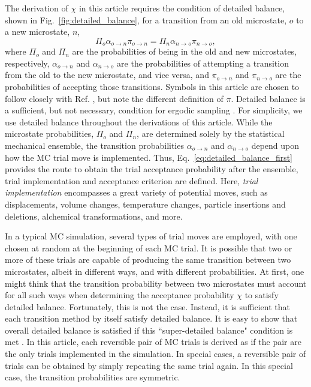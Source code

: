 \documentclass[
  9pt,
  bestpractices,
]{livecoms}
\begin{document}
The derivation of $\chi$ in this article requires the condition of detailed balance, shown in Fig.~\ref{fig:detailed_balance}, for a transition from an old microstate, $o$ to a new microstate, $n$,
\begin{equation}
\Pi_o\alpha_{o\rightarrow n}\pi_{o\rightarrow n} = \Pi_n\alpha_{n\rightarrow o}\pi_{n\rightarrow o},
\label{eq:detailed_balance_first}
\end{equation}
where $\Pi_o$ and $\Pi_n$ are the probabilities of being in the old and new microstates, respectively, $\alpha_{o\rightarrow n}$ and $\alpha_{n\rightarrow o}$ are the probabilities of attempting a transition from the old to the new microstate, and vice versa, and $\pi_{o\rightarrow n}$ and $\pi_{n\rightarrow o}$ are the probabilities of accepting those transitions.
Symbols in this article are chosen to follow closely with Ref. \cite{frenkel_understanding_2002}, but note the different definition of $\pi$.
Detailed balance is a sufficient, but not necessary, condition for ergodic sampling \cite{manousiouthakis_strict_1999}.
For simplicity, we use detailed balance throughout the derivations of this article.
While the microstate probabilities, $\Pi_o$ and $\Pi_n$, are determined solely by the statistical mechanical ensemble, the transition probabilities $\alpha_{o\rightarrow n}$ and $\alpha_{n\rightarrow o}$ depend upon how the MC trial move is implemented.
Thus, Eq.~\ref{eq:detailed_balance_first} provides the route to obtain the trial acceptance probability after the ensemble, trial implementation and acceptance criterion are defined.
Here, \emph{trial implementation} encompasses a great variety of potential moves, such as displacements, volume changes, temperature changes, particle insertions and deletions, alchemical transformations, and more.

In a typical MC simulation, several types of trial moves are employed, with one chosen at random at the beginning of each MC trial.
It is possible that two or more of these trials are capable of producing the same transition between two microstates, albeit in different ways, and with different probabilities.
At first, one might think that the transition probability between two microstates must account for all such ways when determining the acceptance probability $\chi$ to satisfy detailed balance.
Fortunately, this is not the case.
Instead, it is sufficient that each transition method by itself satisfy detailed balance.
It is easy to show that overall detailed balance is satisfied if this ``super-detailed balance" condition is met \cite{frenkel_speed-up_2004}.
In this article, each reversible pair of MC trials is derived as if the pair are the only trials implemented in the simulation.
In special cases, a reversible pair of trials can be obtained by simply repeating the same trial again.
In this special case, the transition probabilities are symmetric.
\end{document}
